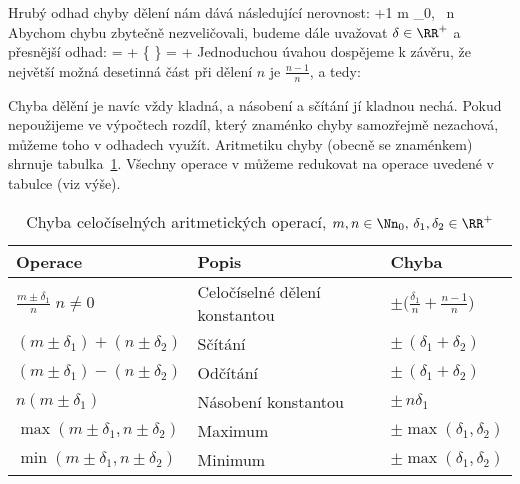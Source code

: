         Hrubý odhad chyby dělení nám dává následující nerovnost:
        \beq
         \le \Big\lfloor {} \Big\rfloor +1 \qquad m \in \Nn_0, \, n \in \Nn
        \eeq
        Abychom chybu zbytečně nezveličovali, budeme dále uvažovat $\delta \in \RR^+$ a přesnější odhad:
        \beq
         = \Big\lfloor {} \Big\rfloor + \Big\{  \Big\} = \Big\lfloor {} \Big\rfloor + \delta
        \eeq
        Jednoduchou úvahou dospějeme k závěru, že největší možná desetinná část při dělení $n$ je $\frac{n-1}{n}$, a tedy:
        \beq
        \delta \leq {}
        \eeq

        Chyba dělění je navíc vždy kladná, a násobení a sčítání jí kladnou nechá. Pokud nepoužijeme ve výpočtech rozdíl, který znaménko chyby samozřejmě nezachová, můžeme toho v odhadech využít. Aritmetiku chyby (obecně se znaménkem) shrnuje tabulka~\ref{tabulka max chyby}. Všechny operace v \LAsq můžeme redukovat na operace uvedené v tabulce (viz výše).

        \begin{table}[h]\label{tabulka max chyby}
    \begin{center}
    \begin{tabular}{lll}
      \toprule
      Operace & Popis & Chyba\\
      \midrule
      $\frac{m\pm\delta_1}{n} \; n \neq 0 $ & Celočíselné dělení konstantou & $\pm \Big( \frac{\delta_1}{n} + \frac{n-1}{n}\Big)$ \\
      $(m\pm\delta_1)+(n\pm\delta_2) $      & Sčítání                       & $\pm \,(\delta_1+\delta_2)$ \\
      $(m\pm\delta_1)-(n\pm\delta_2) $      & Odčítání                      & $\pm \,(\delta_1+\delta_2)$ \\
      $n(m\pm\delta_1) $                    & Násobení konstantou           & $\pm \,n\delta_1$ \\
      $\max(m\pm\delta_1,n\pm\delta_2) $    & Maximum                       & $\pm \max(\delta_1,\delta_2)$ \\
      $\min(m\pm\delta_1,n\pm\delta_2) $    & Minimum                       & $\pm \max(\delta_1,\delta_2)$ \\
      \bottomrule
    \end{tabular}
    \caption{Chyba celočíselných aritmetických operací, $m,n \in \Nn_0, \,\delta_1,\delta_2 \in \RR^+$}
    \end{center}
        \end{table}

